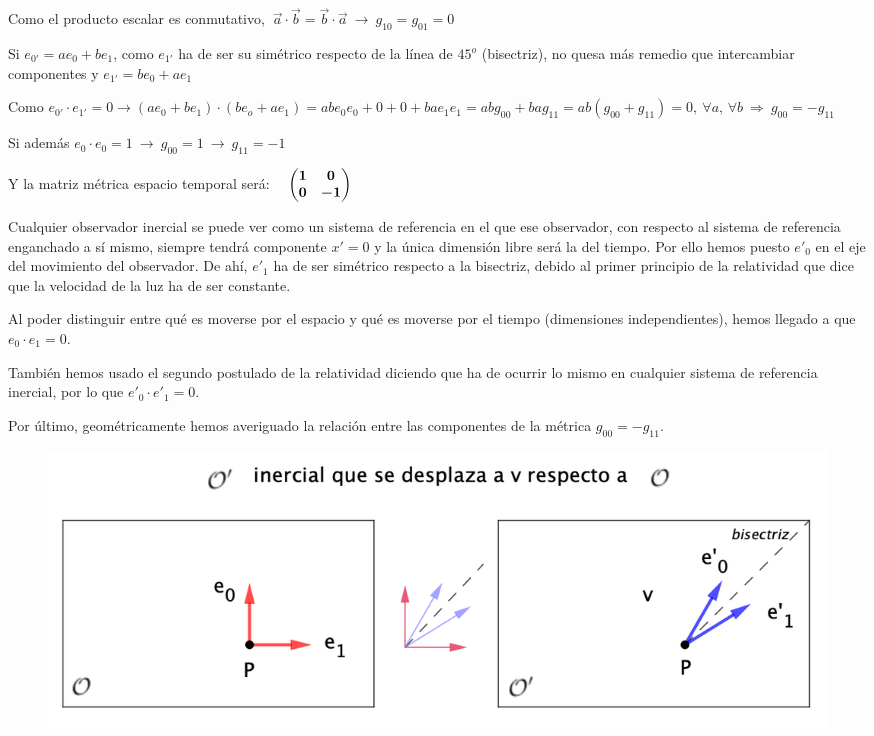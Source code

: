 	
Como el producto escalar es conmutativo, $\ \vec a \cdot \vec b=\vec b \cdot \vec a \ \to \ g_{10}=g_{01}=0$	

Si $e_{0'}=ae_0+be_1$, como $e_{1'}$ ha de ser su simétrico respecto de la línea de $45^o$ (bisectriz), no quesa más remedio que intercambiar componentes y $e_{1'}=be_0+ae_1$

Como $e_{0'}\cdot e_{1'}=0 \to (ae_0+be_1)\cdot (be_o+ae_1)=abe_0e_0+0+0+bae_1e_1=abg_{00}+bag_{11}=ab(g_{00}+g_{11})=0,\ \forall a,\, \forall b \ \Rightarrow \ g_{00}=-g_{11}$

Si además $e_0\cdot e_0=1 \ \to\ g_{00}=1 \ \to \ g_{11}=-1$

Y la matriz métrica espacio temporal será: $\quad \boldsymbol{\mqty(1&0\\0&-1)}$

\begin{small}
\textcolor{gris}{	
Cualquier observador inercial se puede ver como un sistema de referencia en el que ese observador, con respecto al sistema de referencia enganchado a sí mismo, siempre tendrá componente $x'=0$ y la única dimensión libre será la del tiempo. Por ello hemos puesto $e'_0$ en el eje del movimiento del observador. De ahí, $e'_1$ ha de ser  simétrico respecto a la bisectriz, debido al primer principio de la relatividad que dice que la velocidad de la luz ha de ser constante.}

\textcolor{gris}{Al poder distinguir entre qué es moverse por el espacio y qué es moverse por el tiempo (dimensiones independientes), hemos llegado a que $e_0	 \cdot  e_1=0$.}

\textcolor{gris}{También hemos usado el segundo postulado de la relatividad diciendo que ha de ocurrir lo mismo en cualquier sistema de referencia inercial, por lo que $e'_0 \cdot e'_1=0$.}

\textcolor{gris}{Por último, geométricamente hemos averiguado la relación entre las componentes de la métrica $g_{00}=-g_{11}$.}
\end{small}		

\vspace{5mm}	
\begin{figure}[H]
	\centering
	\includegraphics[width=.75\textwidth]{imagenes/img30-07.png}
\end{figure}	


